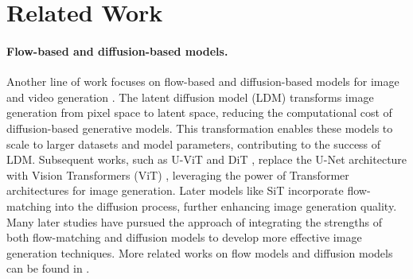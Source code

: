 \section{Related Work}
\label{sec:related_work}



\paragraph{Flow-based and diffusion-based models.} Another line of work focuses on flow-based and diffusion-based models for image and video generation \cite{hja20,hhs23,ltl+24}. The latent diffusion model (LDM) \cite{rbl+22} transforms image generation from pixel space to latent space, reducing the computational cost of diffusion-based generative models. This transformation enables these models to scale to larger datasets and model parameters, contributing to the success of LDM. Subsequent works, such as  U-ViT \cite{bnx+23} and  DiT \cite{px23}, replace the U-Net architecture with Vision Transformers (ViT) \cite{d20}, leveraging the power of Transformer architectures for image generation. Later models like SiT \cite{aak21} incorporate flow-matching into the diffusion process, further enhancing image generation quality. Many later studies \cite{ekb+24,jsl+24,wsd+24,wcz+23,wxz+24} have pursued the approach of integrating the strengths of both flow-matching and diffusion models to develop more effective image generation techniques. More related works on flow models and diffusion models can be found in \cite{hst+22,swyy23,wsd+24,lssz24_gm,llss24,hwl+24,hwsl24,lzw+24,cgl+25_homo,ccl+25,csy25,cll+25_var,cgl+25_gen,ssz+25_dit,ssz+25_prune}.

